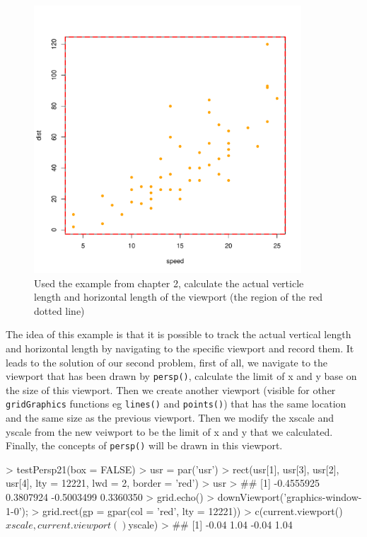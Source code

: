 \documentclass[paper=a4, fontsize=11pt]{report}
\begin{document}
\begin{figure}[h]
	\begin{center}
		\includegraphics[height = 10cm, width = 10cm]{figure/gridGraphics_persp_demo_1.pdf}
		\caption{Used the example from chapter 2, calculate the actual verticle length and horizontal length of the viewport (the region of the red dotted line)}
		\label{figure_4.2}
	\end{center}
\end{figure}

\newpage
The idea of this example is that it is possible to track the actual vertical length and horizontal length by navigating to the specific viewport and record them. It leads to the solution of our second problem, first of all, we navigate to the viewport that has been drawn by \texttt{persp()}, calculate the limit of x and y base on the size of this viewport. Then we create another viewport (visible for other \texttt{gridGraphics} functions eg \texttt{lines()} and \texttt{points()}) that has the same location and the same size as the previous viewport. Then we modify the xscale and yscale from the new veiwport to be the limit of x and y that we calculated. Finally, the concepts of \texttt{persp()} will be drawn in this viewport. \\

\begin{Schunk}
\begin{Sinput}
> testPersp21(box = FALSE)
> usr = par('usr')
> rect(usr[1], usr[3], usr[2], usr[4], lty = 12221, lwd = 2, border = 'red')
> usr
> ## [1] -0.4555925  0.3807924 -0.5003499  0.3360350
> grid.echo()
> downViewport('graphics-window-1-0'); 
> grid.rect(gp = gpar(col = 'red', lty = 12221))
> c(current.viewport()$xscale, current.viewport()$yscale)
> ## [1] -0.04  1.04 -0.04  1.04
\end{Sinput}
\end{Schunk}
\end{document}
